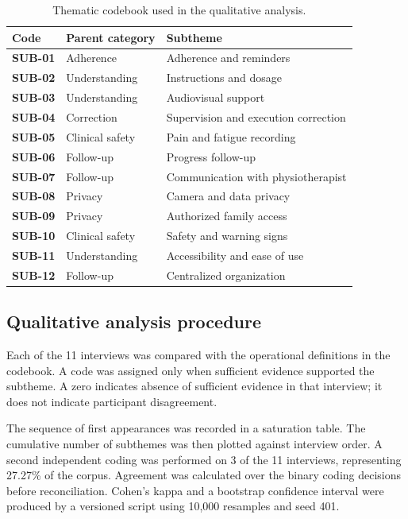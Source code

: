 \documentclass[pdflatex,sn-basic]{sn-jnl}
\begin{document}
\begin{table}[H]
\centering
\small
\caption{Thematic codebook used in the qualitative analysis.}
\label{tab:codes}
\begin{tabularx}{\textwidth}{>{\bfseries}p{1.4cm}p{3.2cm}X}
\toprule
Code & Parent category & Subtheme \\
\midrule
SUB-01 & Adherence & Adherence and reminders \\
SUB-02 & Understanding & Instructions and dosage \\
SUB-03 & Understanding & Audiovisual support \\
SUB-04 & Correction & Supervision and execution correction \\
SUB-05 & Clinical safety & Pain and fatigue recording \\
SUB-06 & Follow-up & Progress follow-up \\
SUB-07 & Follow-up & Communication with physiotherapist \\
SUB-08 & Privacy & Camera and data privacy \\
SUB-09 & Privacy & Authorized family access \\
SUB-10 & Clinical safety & Safety and warning signs \\
SUB-11 & Understanding & Accessibility and ease of use \\
SUB-12 & Follow-up & Centralized organization \\
\bottomrule
\end{tabularx}
\end{table}

\subsection{Qualitative analysis procedure}
Each of the 11 interviews was compared with the operational definitions in the codebook. A code was assigned only when sufficient evidence supported the subtheme. A zero indicates absence of sufficient evidence in that interview; it does not indicate participant disagreement.

The sequence of first appearances was recorded in a saturation table. The cumulative number of subthemes was then plotted against interview order. A second independent coding was performed on 3 of the 11 interviews, representing 27.27\% of the corpus. Agreement was calculated over the binary coding decisions before reconciliation. Cohen's kappa and a bootstrap confidence interval were produced by a versioned script using 10,000 resamples and seed 401.
\end{document}
